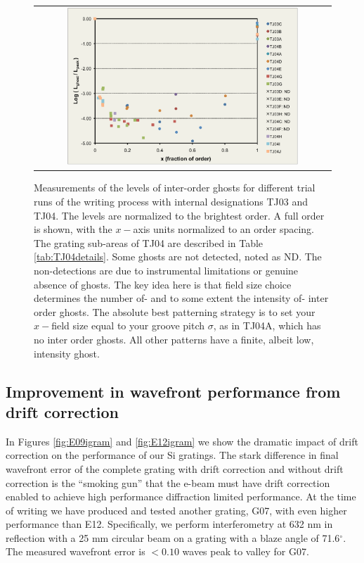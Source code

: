 \begin{figure}
\begin{center}
 \begin{tabular}{c}
    \includegraphics[width=0.8\textwidth]{chSPIE_2014_ebeam/figs/TJ04_ghosts_pretty_alt.pdf}
   \end{tabular}
  \end{center}
  \caption[Ghost level measurements]{\label{fig:GhostLevelFig} Measurements of the levels of inter-order ghosts for different trial runs of the writing process with internal designations TJ03 and TJ04.  The levels are normalized to the brightest order.  A full order is shown, with the $x-$axis units normalized to an order spacing.  The grating sub-areas of TJ04 are described in Table \ref{tab:TJ04details}.  Some ghosts are not detected, noted as ND.  The non-detections are due to instrumental limitations or genuine absence of ghosts.  The key idea here is that field size choice determines the number of- and to some extent the intensity of- inter order ghosts.  The absolute best patterning strategy is to set your $x-$field size equal to your groove pitch $\sigma$, as in TJ04A, which has no inter order ghosts.  All other patterns have a finite, albeit low, intensity ghost.  }
\end{figure}


\subsection{Improvement in wavefront performance from drift correction}
In Figures \ref{fig:E09igram} and \ref{fig:E12igram} we show the dramatic impact of drift correction on the performance of our Si gratings.  The stark difference in final wavefront error of the complete grating with drift correction and without drift correction is the ``smoking gun'' that the e-beam must have drift correction enabled to achieve high performance diffraction limited performance.  At the time of writing we have produced and tested another grating, G07, with even higher performance than E12.  Specifically, we perform interferometry at 632 nm in reflection with a 25 mm circular beam on a grating with a blaze angle of 71.6$^\circ$.  The measured wavefront error is $<0.10$ waves peak to valley for G07.

